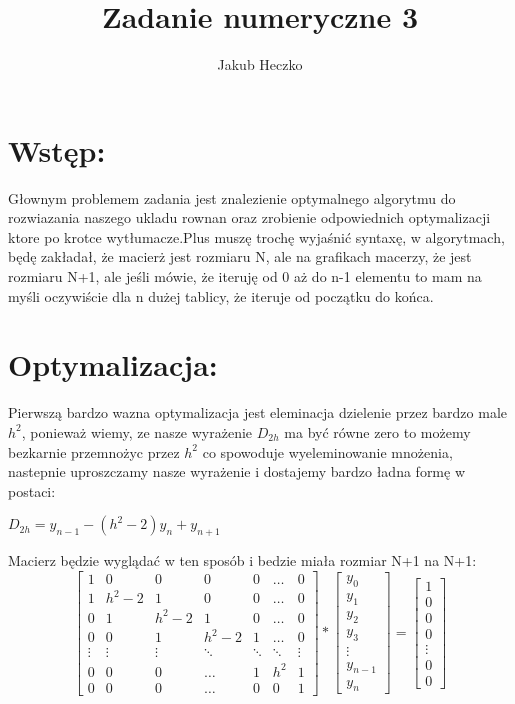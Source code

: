 \documentclass[12pt]{article}
\title{Zadanie numeryczne 3}
\author{Jakub Heczko}
\date{}
\begin{document}
\section{Wstęp:}
Głownym problemem zadania jest znalezienie optymalnego algorytmu do rozwiazania naszego ukladu rownan oraz zrobienie odpowiednich optymalizacji ktore po krotce wytłumacze.Plus muszę trochę wyjaśnić syntaxę, w algorytmach, będę zakładał, że macierż jest rozmiaru N, ale na grafikach macerzy, że jest rozmiaru N+1, ale jeśli mówie, że iteruję od 0 aż do n-1 elementu to mam na myśli oczywiście dla n dużej tablicy, że iteruje od początku do końca.
\section{Optymalizacja:}
Pierwszą bardzo wazna optymalizacja jest eleminacja dzielenie przez bardzo male $h^{2}$, ponieważ wiemy, ze nasze wyrażenie $D_{2h}$ ma być równe zero to możemy bezkarnie przemnożyc przez $h^2$ co spowoduje wyeleminowanie mnożenia, nastepnie uproszczamy nasze wyrażenie i dostajemy bardzo ładna formę w postaci: 
\newline
\begin{center}
    $D_{2h} = y_{n-1} - (h^{2} - 2)y_{n} + y_{n+1}$
\end{center}
Macierz będzie wyglądać w ten sposób i bedzie miała rozmiar N+1 na N+1:
\[
\begin{bmatrix}
    1 & 0 & 0 & 0 & 0 & \dots & 0\\
    1 & h^{2}-2 & 1 & 0 & 0 & \dots & 0\\ 
    0 & 1 & h^{2}-2 & 1 & 0 & \dots & 0\\
    0 & 0 & 1 & h^{2}-2 & 1 &\dots & 0\\
    \vdots & \vdots & \vdots & \ddots & \ddots & \ddots & \vdots\\
    0 & 0 & 0 & \hdots & 1 & h^{2} & 1\\
    0 & 0 & 0 & \hdots & 0 & 0 & 1
\end{bmatrix}
*
\begin{bmatrix}
    y_{0}\\
    y_{1}\\
    y_{2}\\
    y_{3}\\
    \vdots\\
    y_{n-1}\\
    y_{n}
\end{bmatrix}
=
\begin{bmatrix}
    1\\
    0\\
    0\\
    0\\
    \vdots\\
    0\\
    0
\end{bmatrix}
\]
\end{document}
